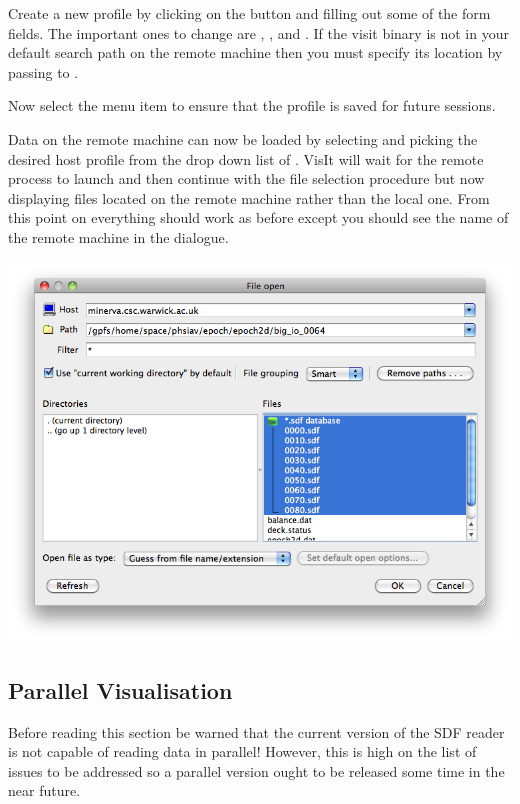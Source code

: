   Create a new profile by clicking on the  button and filling
  out some of the form fields. The important ones to change are , ,  and .
  If the visit binary is not in your default search path on the remote
  machine then you must specify its location by passing  to .

  Now select the  menu item to
  ensure that the profile is saved for future sessions.

  Data on the remote machine can now be loaded by selecting  and picking the desired host profile
  from the drop down list of . VisIt will wait for the
  remote process to launch and then continue with the file selection
  procedure but now displaying files located on the remote machine
  rather than the local one. From this point on everything should work
  as before except you should see the name of the remote machine in the
   dialogue. 

  \begin{center}
    \includegraphics[width=0.8\linewidth]{images/visit_host_files}
  \end{center}

\subsection{Parallel Visualisation}
  Before reading this section be warned that the current version of
  the SDF reader is not capable of reading data in parallel! However,
  this is high on the list of issues to be addressed so a parallel
  version ought to be released some time in the near future.

